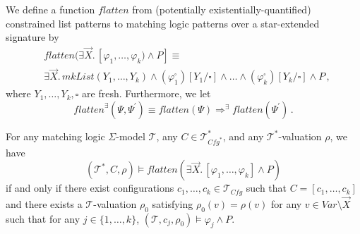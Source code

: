 \begin{definition}\label{def:flatten}
    We define a function $\mathit{flatten}$ from (potentially existentially-quantified) constrained list patterns
    to matching logic patterns over a star-extended signature by
    \begin{align*}
        & \mathit{flatten}(\exists \vec{X}.\, [\varphi_1, \ldots, \varphi_k) \land P] \equiv \\
        & \exists \vec{X}.\, \mathit{mkList}(Y_1, \ldots, Y_k)
        \land (\varphi_1^\square)[Y_1/\square] \land \ldots
        \land (\varphi_k^\square)[Y_k/\square] \land P \, ,
    \end{align*}
    where $Y_1,\ldots,Y_k,\square$ are fresh.
    Furthermore, we let
    \begin{equation*}
        \mathit{flatten}^\exists(\Psi,\Psi^\prime) \equiv \mathit{flatten}(\Psi) \Rightarrow^\exists \mathit{flatten}(\Psi^\prime) \, .
    \end{equation*}
\end{definition}


\begin{lemma}[On Flattening]\label{lem:flatten}
    For any matching logic $\Sigma$-model $\mathcal{T}$, any $C \in \mathcal{T}^*_{\mathit{Cfg}^*}$,
    and any $\mathcal{T}^*$-valuation $\rho$, we have
        \begin{equation*}
            (\mathcal{T}^*, C, \rho) \vDash \mathit{flatten}(\exists \vec{X}.\, [\varphi_1,\ldots,\varphi_k] \land P)
        \end{equation*}
    if and only if
        there exist configurations $c_1, \ldots, c_k \in \mathcal{T}_{\mathit{Cfg}}$ such that
        $C = [c_1, \ldots, c_k]$ and there exists a $\mathcal{T}$-valuation $\rho_0$
        satisfying $\rho_0(v) = \rho(v)$ for any $v \in \mathit{Var} \setminus \vec{X}$
        such that for any $j \in \{ 1, \ldots, k \}$,
        $(\mathcal{T}, c_j, \rho_0) \vDash \varphi_j \land P$.
\end{lemma}


